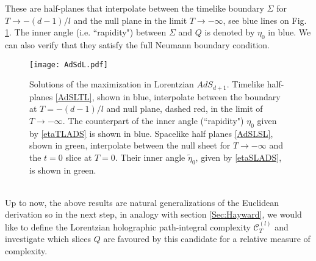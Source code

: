 \documentclass[a4paper,12pt]{article}
\begin{document}
These are half-planes that interpolate between the timelike boundary $\Sigma$ for $T\to-(d-1)/l$ and the null plane in the limit $T\to -\infty$, see blue lines on Fig. \ref{SolLorAdS}. The inner angle (i.e. ``rapidity") between $\Sigma$ and $Q$ is denoted by $\eta_0$ in blue. We can also verify that they satisfy the full Neumann boundary condition.
\begin{figure}[b!]
  \centering
  \texttt{[image: AdSdL.pdf]}
  \caption{Solutions of the maximization in Lorentzian $AdS_{d+1}$.  Timelike half-planes \eqref{AdSLTL}, shown in blue, interpolate between the boundary at $T=-(d-1)/l$ and null plane, dashed red,  in the limit of $T\to-\infty$. The counterpart of the inner angle (``rapidity") $\eta_0$ given by \eqref{etaTLADS} is shown in blue. Spacelike half planes \eqref{AdSLSL}, shown in green, interpolate between the null sheet for $T\to-\infty$ and the $t=0$ slice at $T=0$. Their inner angle $\tilde{\eta}_0$, given by \eqref{etaSLADS}, is shown in green.}
\label{SolLorAdS}
\end{figure}\\

Up to now, the above results are natural generalizations of the Euclidean derivation so in the next step, in analogy with section \ref{Sec:Hayward}, we would like to define the Lorentzian holographic path-integral complexity $\mathcal{C}^{(l)}_T$ and investigate which slices $Q$ are favoured by this candidate for a relative measure of complexity.
\end{document}
